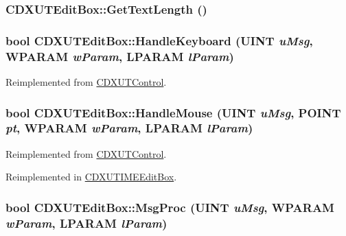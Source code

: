 \label{class_c_d_x_u_t_edit_box_aa1b4a760e28f3176c18bd635c88525f5}
\hypertarget{class_c_d_x_u_t_edit_box_a2bb1d1ebe99c30ef317824e852882126}{
\subsubsection[{GetTextLength}]{ CDXUTEditBox::GetTextLength ()}}
\label{class_c_d_x_u_t_edit_box_a2bb1d1ebe99c30ef317824e852882126}
\hypertarget{class_c_d_x_u_t_edit_box_a579bcc8298d08c9d52fbf917fa046442}{
\subsubsection[{HandleKeyboard}]{\setlength{\rightskip}{0pt plus 5cm}bool CDXUTEditBox::HandleKeyboard (UINT {\em uMsg}, \/  WPARAM {\em wParam}, \/  LPARAM {\em lParam})}}
\label{class_c_d_x_u_t_edit_box_a579bcc8298d08c9d52fbf917fa046442}


Reimplemented from \hyperlink{class_c_d_x_u_t_control_a94044e608adeac7c329d83cf63587dcf}{CDXUTControl}.\hypertarget{class_c_d_x_u_t_edit_box_afadff4a882c187926a7b8173eb7d97cc}{
\subsubsection[{HandleMouse}]{\setlength{\rightskip}{0pt plus 5cm}bool CDXUTEditBox::HandleMouse (UINT {\em uMsg}, \/  POINT {\em pt}, \/  WPARAM {\em wParam}, \/  LPARAM {\em lParam})}}
\label{class_c_d_x_u_t_edit_box_afadff4a882c187926a7b8173eb7d97cc}


Reimplemented from \hyperlink{class_c_d_x_u_t_control_a263979b3221cb7a44b4caea72366c335}{CDXUTControl}.

Reimplemented in \hyperlink{class_c_d_x_u_t_i_m_e_edit_box_a02795ef1096e7a276afdc501c606eab9}{CDXUTIMEEditBox}.\hypertarget{class_c_d_x_u_t_edit_box_adca915977ba1b8019594ef5d350ed03e}{
\subsubsection[{MsgProc}]{\setlength{\rightskip}{0pt plus 5cm}bool CDXUTEditBox::MsgProc (UINT {\em uMsg}, \/  WPARAM {\em wParam}, \/  LPARAM {\em lParam})}}
\label{class_c_d_x_u_t_edit_box_adca915977ba1b8019594ef5d350ed03e}


